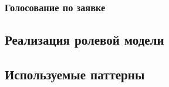 \documentclass[a4paper,12pt,reqno]{article}
\begin{document}
\subsubsection{Голосование по заявке} \label{sec: vote_seq}


\subsection{Реализация ролевой модели}



\subsection{Используемые паттерны}




\end{document}
